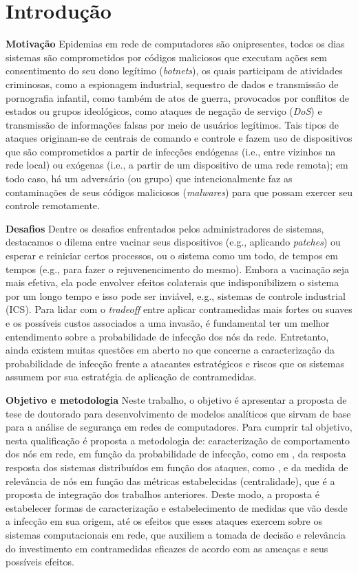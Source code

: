 
\chapter{Introdução}


	\textbf{Motivação} Epidemias em rede de computadores são onipresentes, todos os dias sistemas são comprometidos por códigos maliciosos que executam ações sem consentimento do seu dono legítimo (\textit{botnets}), os quais participam de atividades criminosas, como a espionagem industrial, sequestro de dados e transmissão de pornografia infantil, como também de atos de guerra, provocados por conflitos de estados ou grupos ideológicos, como ataques de negação de serviço (\textit{DoS}) e transmissão de informações falsas por meio de usuários legítimos. Tais tipos de ataques originam-se de centrais de comando e controle e fazem uso de dispositivos que são comprometidos a partir de infecções endógenas (i.e., entre vizinhos na rede local) ou exógenas (i.e., a partir de um dispositivo de uma rede remota); em todo caso, há um adversário (ou grupo) que intencionalmente faz as contaminações de seus códigos maliciosos (\textit{malwares}) para que possam exercer seu controle remotamente. 


    \textbf{Desafios} 
    Dentre os desafios enfrentados pelos administradores de sistemas, destacamos o dilema entre vacinar seus dispositivos (e.g., aplicando \emph{patches}) ou esperar e reiniciar certos processos, ou o sistema como um todo, de tempos em tempos (e.g., para fazer o rejuvenencimento do mesmo).  Embora a vacinação seja mais efetiva, ela pode envolver efeitos colaterais que indisponibilizem o sistema por um longo tempo e isso pode ser inviável, e.g., sistemas de controle industrial (ICS).  Para lidar com o \emph{tradeoff} entre aplicar contramedidas mais fortes ou  suaves e os possíveis custos associados a uma invasão, é fundamental ter um melhor entendimento sobre a probabilidade de infecção dos nós da rede.  Entretanto, ainda existem muitas questões em aberto no que concerne  a caracterização da probabilidade de infecção frente a atacantes estratégicos e riscos que os sistemas assumem por sua estratégia de aplicação de contramedidas.

    \textbf{Objetivo e metodologia} Neste trabalho, o objetivo é apresentar a proposta de tese de doutorado para desenvolvimento de modelos analíticos que sirvam de base para a análise de segurança em redes de computadores. Para cumprir tal objetivo, nesta qualificação é proposta a metodologia de: caracterização de comportamento dos nós em rede, em função da probabilidade de infecção, como em \cite{rufino2018contaminaccao}, da resposta resposta dos sistemas distribuídos em função dos ataques, como \cite{avritzer2019pptam}, e da medida de relevância de nós em função das métricas estabelecidas (centralidade), que é a proposta de integração dos trabalhos anteriores. Deste modo, a proposta é estabelecer formas de caracterização e estabelecimento de medidas que vão desde a infecção em sua origem, até os efeitos que esses ataques exercem sobre os sistemas computacionais em rede, que auxiliem a tomada de decisão e relevância do investimento em contramedidas eficazes de acordo com as ameaças e seus possíveis efeitos.
    

